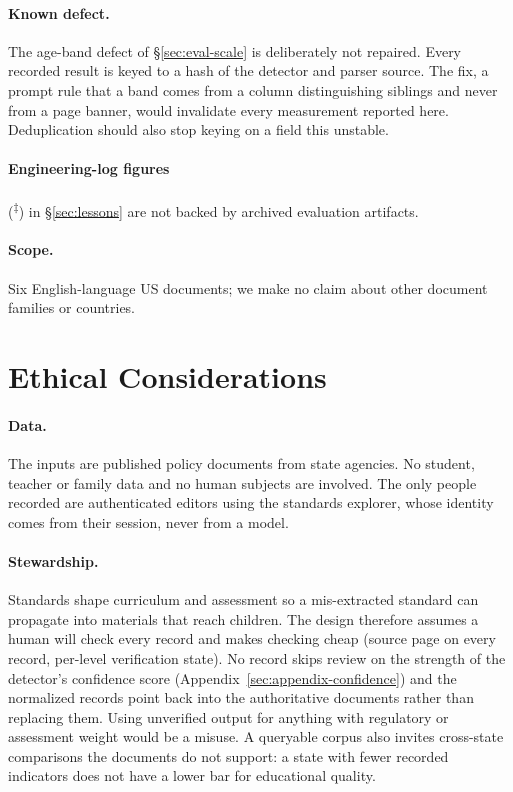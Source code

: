 \documentclass[11pt]{article}
\newcommand{\elog}{\textsuperscript{$\ddagger$}}
\begin{document}
\paragraph{Known defect.} The age-band defect of
\S\ref{sec:eval-scale} is deliberately not repaired. Every recorded result is
keyed to a hash of the detector and parser source. The fix, a prompt rule
that a band comes from a column distinguishing siblings and never from a page
banner, would invalidate every measurement reported here. Deduplication should
also stop keying on a field this unstable.

\paragraph{Engineering-log figures} (\elog)
in \S\ref{sec:lessons} are not backed by archived evaluation artifacts.

\paragraph{Scope.} Six English-language US documents; we make no claim about other
document families or countries.

\section*{Ethical Considerations}
\label{sec:ethics}\label{sec:artifacts-statement}

\paragraph{Data.} The inputs are published policy documents from state
agencies. No student, teacher or family data and no human subjects are involved. The only people recorded are authenticated editors using the standards explorer, whose identity
comes from their session, never from a model.

\paragraph{Stewardship.} Standards shape curriculum and assessment so a
mis-extracted standard can propagate into materials that reach children. The
design therefore assumes a human will check every record and makes checking
cheap (source page on every record, per-level verification state). No record
skips review on the strength of the detector's confidence score
(Appendix~\ref{sec:appendix-confidence}) and the normalized records point back into the authoritative documents rather than replacing them. Using unverified output for anything with regulatory or
assessment weight would be a misuse. A queryable corpus also invites cross-state
comparisons the documents do not support: a state with fewer recorded
indicators does not have a lower bar for educational quality.
\end{document}
